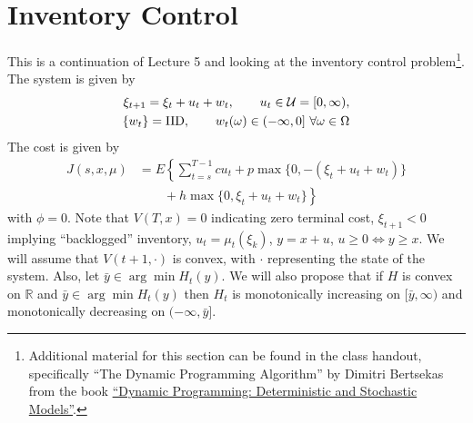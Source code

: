 
\mainmatter
\setcounter{page}{1}

\lectureseries[\course]{\course}

\date{October 15, 2009}

\setaddress

\setcounter{lecture}{5}
\setcounter{chapter}{5}


\section{Inventory Control}
This is a continuation of Lecture 5 and looking at the inventory control problem\footnote{Additional material for this section can be found in the class handout, specifically ``The Dynamic Programming Algorithm'' by Dimitri Bertsekas from the book \href{http://www.amazon.com/Dynamic-Programming-Deterministic-Stochastic-Models/dp/0132215810}{``Dynamic Programming: Deterministic and Stochastic Models''}.}. The system is given by
\begin{align*}
\xi_{t+1} = \xi_t+u_t+w_t, \qquad u_t\in\mathcal{U} = [0,\infty), \\
\{w_t\} = \text{IID}, \qquad w_t(\omega) \in (-\infty,0] ~\forall \omega\in\Omega
\end{align*}
The cost is given by
\begin{align*}
J(s,x,\mu) &= E\left\lbrace\sum_{t=s}^{T-1} cu_t + p\max\{0,-(\xi_t+u_t+w_t)\} \right. \\
&\left. \qquad + h\max\{0,\xi_t+u_t+w_t\}\right\rbrace
\end{align*}
with $\phi=0$. Note that $V(T,x)=0$ indicating zero terminal cost, $\xi_{t+1}<0$ implying ``backlogged'' inventory, $u_t=\mu_t(\xi_k)$, $y=x+u$, $u\geq 0\Leftrightarrow y\geq x$. We will assume that $V(t+1,\cdot)$ is convex, with $\cdot$ representing the state of the system. Also, let $\bar{y}\in\arg\min H_t(y)$. We will also propose that if $H$ is convex on $\mathbb{R}$ and $\bar{y}\in\arg\min H_t(y)$ then $H_t$ is monotonically increasing on $[\bar{y},\infty)$ and monotonically decreasing on $(-\infty,\bar{y}]$.

